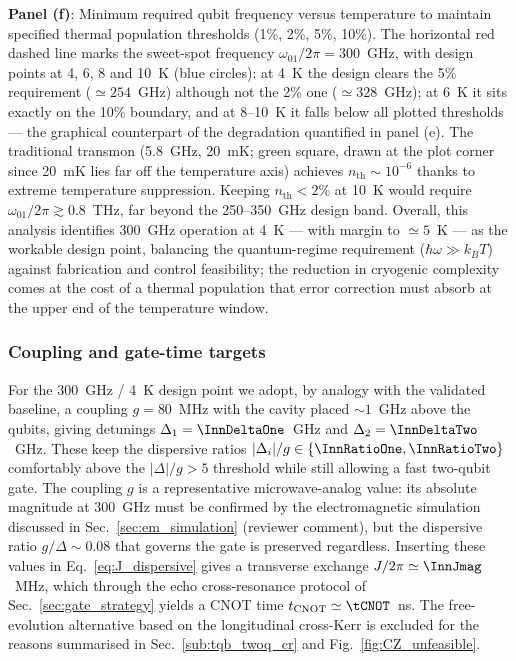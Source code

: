 \textbf{Panel (f)}: Minimum required qubit frequency versus temperature to maintain specified thermal population thresholds (1\%, 2\%, 5\%, 10\%). The horizontal red dashed line marks the sweet-spot frequency $\omega_{01}/2\pi = 300$~GHz, with design points at 4, 6, 8 and 10~K (blue circles): at 4~K the design clears the 5\% requirement ($\simeq 254$~GHz) although not the 2\% one ($\simeq 328$~GHz); at 6~K it sits exactly on the 10\% boundary, and at 8--10~K it falls below all plotted thresholds --- the graphical counterpart of the degradation quantified in panel (e). The traditional transmon (5.8~GHz, 20~mK; green square, drawn at the plot corner since 20~mK lies far off the temperature axis) achieves $n_{\text{th}} \sim 10^{-6}$ thanks to extreme temperature suppression. Keeping $n_{\text{th}} < 2\%$ at 10~K would require $\omega_{01}/2\pi \gtrsim 0.8$~THz, far beyond the 250--350~GHz design band.
Overall, this analysis identifies 300~GHz operation at 4~K --- with margin to $\simeq 5$~K --- as the workable design point, balancing the quantum-regime requirement ($\hbar\omega \gg k_B T$) against fabrication and control feasibility; the reduction in cryogenic complexity comes at the cost of a thermal population that error correction must absorb at the upper end of the temperature window.

\subsubsection{Coupling and gate-time targets}

For the 300~GHz / 4~K design point we adopt, by analogy with the validated
baseline, a coupling $g = 80$~MHz with the cavity placed $\sim 1$~GHz above the
qubits, giving detunings $\Delta_1 = \InnDeltaOne$~GHz and
$\Delta_2 = \InnDeltaTwo$~GHz. These keep the dispersive ratios
$|\Delta_i|/g \in \{\InnRatioOne, \InnRatioTwo\}$ comfortably above the
$|\Delta|/g > 5$ threshold while still allowing a fast two-qubit gate. The
coupling $g$ is a representative microwave-analog value: its absolute magnitude
at $300$~GHz must be confirmed by the electromagnetic simulation discussed in
Sec.~\ref{sec:em_simulation} (reviewer comment), but the dispersive ratio
$g/\Delta\sim 0.08$ that governs the gate is preserved regardless. Inserting
these values in Eq.~\ref{eq:J_dispersive} gives a transverse exchange
$J/2\pi \simeq \InnJmag$~MHz, which through the echo cross-resonance protocol of
Sec.~\ref{sec:gate_strategy} yields a CNOT time
$t_{\mathrm{CNOT}} \simeq \tCNOT$~ns. The free-evolution alternative
based on the longitudinal cross-Kerr is excluded for the reasons summarised
in Sec.~\ref{sub:tqb_twoq_cr} and Fig.~\ref{fig:CZ_unfeasible}.

